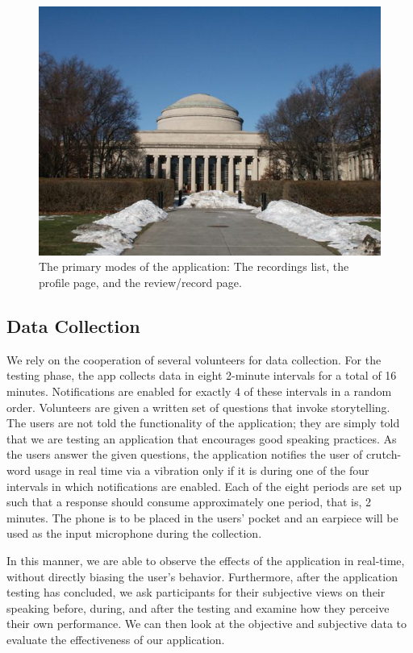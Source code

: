 \documentclass{sigchi}
\begin{document}
\begin{figure}[!h]
\centering
\includegraphics[width=0.9\columnwidth]{Figure1}
\caption{The primary modes of the application: The recordings list, the profile page, and the review/record page.
}
\label{fig:figure1}
\end{figure}

\subsection{Data Collection}

We rely on the cooperation of several volunteers for data collection. For the testing phase, the app collects data in eight 2-minute intervals for a total of 16 minutes. Notifications are enabled for exactly 4 of these intervals in a random order. Volunteers are given a written set of questions that invoke storytelling. The users are not told the functionality of the application; they are simply told that we are testing an application that encourages good speaking practices. As the users answer the given questions, the application notifies the user of crutch-word usage in real time via a vibration only if it is during one of the four intervals in which notifications are enabled. Each of the eight periods are set up such that a response should consume approximately one period, that is, 2 minutes. The phone is to be placed in the users’ pocket and an earpiece will be used as the input microphone during the collection.

In this manner, we are able to observe the effects of the application in real-time, without directly biasing the user’s behavior. Furthermore, after the application testing has concluded, we ask participants for their subjective views on their speaking before, during, and after the testing and examine how they perceive their own performance. We can then look at the objective and subjective data to evaluate the effectiveness of our application.
\end{document}
